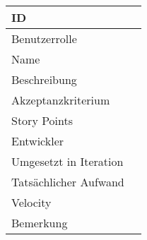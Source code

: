 \begin{tabularx}{\textwidth}{|p{}|X|}
	\hline
	ID & \\
	\hline
	Benutzerrolle & \\
	\hline
	Name & \\
	\hline
	Beschreibung & \\
	\hline
	Akzeptanzkriterium & \\
	\hline
	Story Points & \\
	\hline
	Entwickler & \\
	\hline
	Umgesetzt in Iteration & \\ 
	\hline
	Tatsächlicher Aufwand & \\
	\hline
	Velocity & \\
	\hline
	Bemerkung & \\
	\hline
\end{tabularx}
\vspace{20pt}
